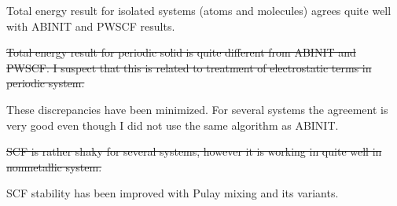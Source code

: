 \documentclass[a4paper,10pt]{article}
\begin{document}
Total energy result for isolated systems (atoms and molecules) agrees quite
well with ABINIT and PWSCF results.

\sout{Total energy result for periodic solid is quite different from ABINIT and PWSCF.
I suspect that this is related to treatment of electrostatic terms in periodic system.}

These discrepancies have been minimized. For several systems the agreement is very good
even though I did not use the same algorithm as ABINIT.

\sout{SCF is rather shaky for several systems, however it is working in quite well in nonmetallic
system.}

SCF stability has been improved with Pulay mixing and its variants.
\end{document}
